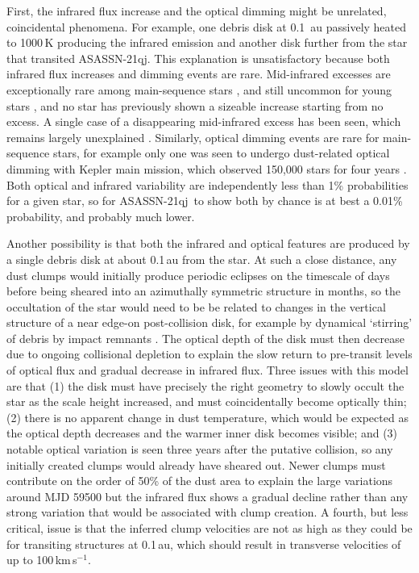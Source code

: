 \documentclass[sn-nature,oneside]{sn-jnl}%
\newcommand{\asas}{ASASSN-21qj}
\begin{document}
First, the infrared flux increase and the optical dimming might be unrelated, coincidental phenomena. 
%
For example, one debris disk at 0.1~au passively heated to 1000\,K producing the infrared emission and another disk further from the star that transited \asas.
%
This explanation is unsatisfactory because both infrared flux increases and dimming events are rare.
%
Mid-infrared excesses are exceptionally rare among main-sequence stars \cite[1:10,000,][]{2013MNRAS.433.2334K}, and still uncommon for young stars \cite[1:100,][]{2013MNRAS.433.2334K}, and no star has previously shown a sizeable increase starting from no excess.
%
A single case of a disappearing mid-infrared excess has been seen, which remains largely unexplained \cite{2012Natur.487...74M}.
%
Similarly, optical dimming events are rare for main-sequence stars, for example only one was seen to undergo dust-related optical dimming with Kepler main mission, which observed 150,000 stars for four years \cite{2016MNRAS.457.3988B}.
%
Both optical and infrared variability are independently less than 1\% probabilities for a given star, so for \asas~to show both by chance is at best a 0.01\% probability, and probably much lower.

Another possibility is that both the infrared and optical features are produced by a single debris disk at about 0.1\,au from the star.
%
At such a close distance, any dust clumps would initially produce periodic eclipses on the timescale of days \citep{2019MNRAS.488.4465G} before being sheared into an azimuthally symmetric structure in months, so the occultation of the star would need to be be related to changes in the vertical structure of a near edge-on post-collision disk, for example by dynamical `stirring' of debris by impact remnants \cite{1992Icar...96..107I}.
%
The optical depth of the disk must then decrease due to ongoing collisional depletion to explain the slow return to pre-transit levels of optical flux and gradual decrease in infrared flux.
%
Three issues with this model are that (1) the disk must have precisely the right geometry to slowly occult the star as the scale height increased, and must coincidentally become optically thin; (2) there is no apparent change in dust temperature, which would be expected as the optical depth decreases and the warmer inner disk becomes visible; and (3) notable optical variation is seen three years after the putative collision, so any initially created clumps would already have sheared out.
%
Newer clumps must contribute on the order of 50\% of the dust area to explain the large variations around MJD 59500 but the infrared flux shows a gradual decline rather than any strong variation that would be associated with clump creation.
%
A fourth, but less critical, issue is that the inferred clump velocities are not as high as they could be for transiting structures at 0.1\,au, which should result in transverse velocities of up to 100\,km\,s$^{-1}$.
\end{document}
